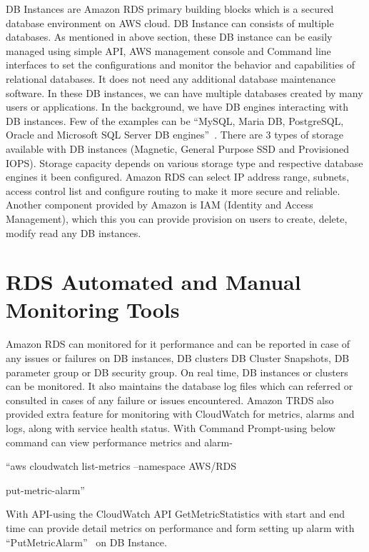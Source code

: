 DB Instances are Amazon RDS primary building blocks which is a secured database 
environment on AWS cloud. DB Instance can consists of multiple databases. 
As mentioned in above section, these DB instance can 
be easily managed using simple API, AWS management console and Command line 
interfaces to set the configurations and monitor the behavior and capabilities 
of relational databases. It does not need any additional database maintenance 
software. In these DB instances, we can have multiple databases created by many 
users or 
applications.
In the background, we have DB engines interacting with DB instances. Few of the 
examples can be ``MySQL, Maria DB, PostgreSQL, Oracle and Microsoft SQL Server DB 
engines''~\cite{hid-sp18-520-amazonrds}.
There are 3 types of storage available with DB instances (Magnetic, General 
Purpose SSD and Provisioned IOPS).
Storage capacity depends on various storage type and respective database engines 
it been configured.
Amazon RDS can select IP address range, subnets, access control list and 
configure routing to make it more secure and reliable.
Another component provided by Amazon is IAM (Identity and Access Management), 
which this you can provide provision on users to create, delete, modify read 
any DB instances.

\section{RDS Automated and Manual Monitoring Tools}

Amazon RDS can monitored for it performance and can be reported in case of 
any issues or failures on DB instances, DB clusters DB Cluster Snapshots, DB 
parameter group or DB security group.
On real time, DB instances or clusters can be monitored. It also maintains the 
database log files which can referred or consulted in cases of any failure or 
issues encountered.  
Amazon TRDS also provided extra feature for monitoring with CloudWatch for 
metrics, alarms and logs, along with service health status. 
With Command Prompt-using below command can view performance metrics and 
alarm- 

``aws cloudwatch list-metrics --namespace AWS/RDS

put-metric-alarm''~\cite{hid-sp18-520-amardsmon}

With API-using the CloudWatch API GetMetricStatistics with start and end time 
can provide detail metrics on performance and form setting up alarm 
with ``PutMetricAlarm''~\cite{hid-sp18-520-amardsmon} on DB Instance.

